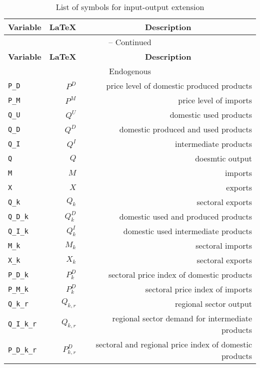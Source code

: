 
\begin{center}
\begin{longtable}{lrr}
\caption{List of symbols for input-output extension}\label{tab:listofsymbolsextension1}\\%
\hline%
\multicolumn{1}{c}{\textbf{Variable}} &
\multicolumn{1}{c}{\textbf{\LaTeX}} &
\multicolumn{1}{c}{\textbf{Description}}\\%
\hline\hline%
\endfirsthead
\multicolumn{3}{c}{{\tablename} \thetable{} -- Continued}\\%
\hline%
\multicolumn{1}{c}{\textbf{Variable}} &
\multicolumn{1}{c}{\textbf{\LaTeX}} &
\multicolumn{1}{c}{\textbf{Description}}\\%
\hline\hline%
\endhead
\hline
\multicolumn{3}{c}{Endogenous}\\%
\hline
\texttt{P\_D} & $P^{D}$ & price level of domestic produced products\\
\texttt{P\_M} & $P^{M}$ & price level of imports\\
\texttt{Q\_U} & $Q^{U}$ & domestic used products \\
\texttt{Q\_D} & $Q^{D}$ & domestic produced and used products\\
\texttt{Q\_I} & $Q^{I}$ & intermediate products\\
\texttt{Q} & $Q$ & doesmtic output\\
\texttt{M} & $M$ & imports\\
\texttt{X} & $X$ & exports\\
\texttt{Q\_k} & ${Q_{k}}$ & sectoral exports\\
\texttt{Q\_D\_k} & ${Q^{D}_{k}}$ & domestic used and produced products\\
\texttt{Q\_I\_k} & ${Q^{I}_{k}}$ & domestic used intermediate products\\
\texttt{M\_k} & ${M_{k}}$ & sectoral imports\\
\texttt{X\_k} & ${X_{k}}$ & sectoral exports\\
\texttt{P\_D\_k} & ${P^{D}_{k}}$ & sectoral price index of domestic products\\
\texttt{P\_M\_k} & ${P^{D}_{k}}$ & sectoral price index of imports\\
\texttt{Q\_k\_r} & ${Q_{k,r}}$ & regional sector output\\
\texttt{Q\_I\_k\_r} & ${Q_{k,r}}$ & regional sector demand for intermediate products\\
\texttt{P\_D\_k\_r} & ${P^{D}_{k,r}}$ & sectoral and regional price index of domestic products\\

\end{longtable}
\end{center}

